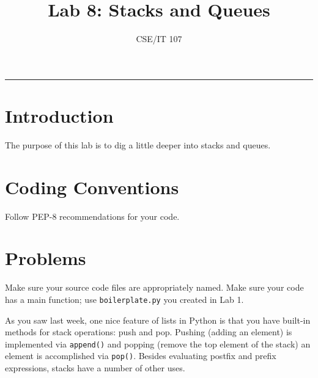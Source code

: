 \documentclass[12pt]{article}
\title{Lab 8: Stacks and Queues}
\author{CSE/IT 107}
\date{}
\begin{document}
\maketitle


\hrule
\section*{Introduction}

The purpose of this lab is to dig a little deeper into stacks and queues.



\section*{Coding Conventions}

Follow PEP-8 recommendations for your code. 

\section*{Problems}

Make sure your source code files are appropriately named. Make sure your code has a main function; use \texttt{boilerplate.py} you created in Lab 1.


As you saw last week, one nice feature of lists in Python is that you have built-in methods for stack operations: push and pop. Pushing (adding an element) is implemented via \texttt{append()} and popping (remove the top element of the stack) an element is accomplished via \texttt{pop()}. Besides evaluating postfix and prefix expressions, stacks have a number of other uses.
\end{document}
